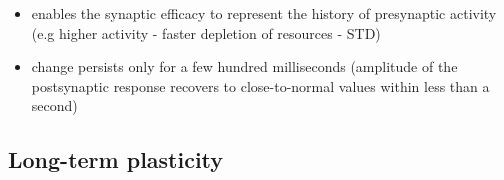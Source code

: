 \documentclass{beamer}
\begin{document}
\begin{frame}
\begin{columns}
\end{columns}

\vspace*{3mm}

\small
{
\begin{itemize}
  \item enables the synaptic efficacy to represent the history of presynaptic activity (e.g higher activity - faster depletion of resources - STD)%
  \item change persists only for a few hundred milliseconds (amplitude of the postsynaptic response recovers to close-to-normal values within less than a second)
\end{itemize}
}

\end{frame}


\subsection{Long-term plasticity}
\end{document}
